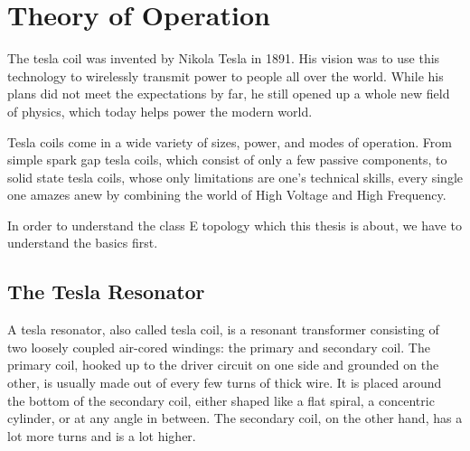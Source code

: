 \chapter{Theory of Operation} %

The tesla coil was invented by Nikola Tesla in 1891. His vision was to use this technology to wirelessly transmit power to people all over the world. While his plans did not meet the expectations by far, he still opened up a whole new field of physics, which today helps power the modern world.

Tesla coils come in a wide variety of sizes, power, and modes of operation. From simple spark gap tesla coils, which consist of only a few passive components, to solid state tesla coils, whose only limitations are one's technical skills, every single one amazes anew by combining the world of High Voltage and High Frequency.

In order to understand the class E topology which this thesis is about, we have to understand the basics first. 

\section{The Tesla Resonator}

A tesla resonator, also called tesla coil, is a resonant transformer consisting of two loosely coupled air-cored windings: the primary and secondary coil. The primary coil, hooked up to the driver circuit on one side and grounded on the other, is usually made out of every few turns of thick wire. It is placed around the bottom of the secondary coil, either shaped like a flat spiral, a concentric cylinder, or at any angle in between. The secondary coil, on the other hand, has a lot more turns and is a lot higher.

